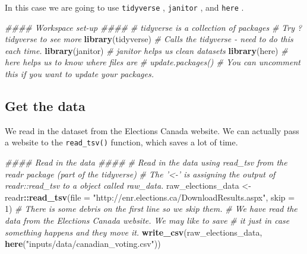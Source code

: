 \documentclass[
]{book}
\newenvironment{Shaded}{\begin{snugshade}}{\end{snugshade}}
\newcommand{\CommentTok}[1]{\textcolor[rgb]{0.56,0.35,0.01}{\textit{#1}}}
\newcommand{\DataTypeTok}[1]{\textcolor[rgb]{0.13,0.29,0.53}{#1}}
\newcommand{\DecValTok}[1]{\textcolor[rgb]{0.00,0.00,0.81}{#1}}
\newcommand{\KeywordTok}[1]{\textcolor[rgb]{0.13,0.29,0.53}{\textbf{#1}}}
\newcommand{\NormalTok}[1]{#1}
\newcommand{\OperatorTok}[1]{\textcolor[rgb]{0.81,0.36,0.00}{\textbf{#1}}}
\newcommand{\StringTok}[1]{\textcolor[rgb]{0.31,0.60,0.02}{#1}}
\begin{document}
In this case we are going to use \texttt{tidyverse} \citet{Wickham2017}, \texttt{janitor} \citet{janitor}, and \texttt{here} \citet{here}.

\begin{Shaded}
\begin{Highlighting}[]
\CommentTok{#### Workspace set-up ####}
\CommentTok{# tidyverse is a collection of packages}
\CommentTok{# Try ?tidyverse to see more}
\KeywordTok{library}\NormalTok{(tidyverse) }\CommentTok{# Calls the tidyverse - need to do this each time.}
\KeywordTok{library}\NormalTok{(janitor) }\CommentTok{# janitor helps us clean datasets}
\KeywordTok{library}\NormalTok{(here) }\CommentTok{# here helps us to know where files are}
\CommentTok{# update.packages() # You can uncomment this if you want to update your packages. }
\end{Highlighting}
\end{Shaded}

\hypertarget{get-the-data}{%
\subsection{Get the data}\label{get-the-data}}

We read in the dataset from the Elections Canada website. We can actually pass a website to the \texttt{read\_tsv()} function, which saves a lot of time.

\begin{Shaded}
\begin{Highlighting}[]
\CommentTok{#### Read in the data ####}
\CommentTok{# Read in the data using read_tsv from the readr package (part of the tidyverse)}
\CommentTok{# The '<-' is assigning the output of readr::read_tsv to a object called raw_data. }
\NormalTok{raw_elections_data <-}\StringTok{ }\NormalTok{readr}\OperatorTok{::}\KeywordTok{read_tsv}\NormalTok{(}\DataTypeTok{file =} \StringTok{"http://enr.elections.ca/DownloadResults.aspx"}\NormalTok{,}
                            \DataTypeTok{skip =} \DecValTok{1}\NormalTok{) }
\CommentTok{# There is some debris on the first line so we skip them.}
\CommentTok{# We have read the data from the Elections Canada website. We may like to save }
\CommentTok{# it just in case something happens and they move it. }
\KeywordTok{write_csv}\NormalTok{(raw_elections_data, }\KeywordTok{here}\NormalTok{(}\StringTok{"inputs/data/canadian_voting.csv"}\NormalTok{))}
\end{Highlighting}
\end{Shaded}
\end{document}
